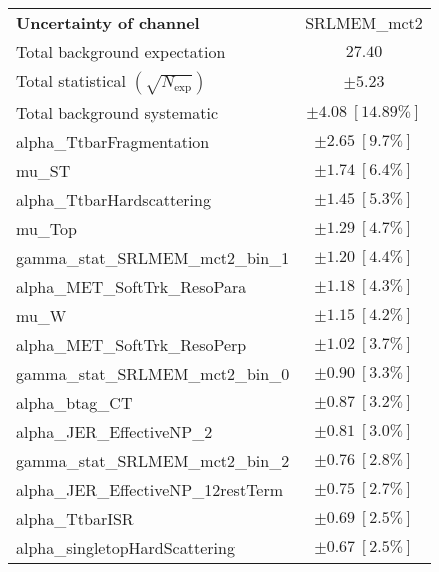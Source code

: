 
\begin{table}
\begin{center}
\setlength{\tabcolsep}{0.0pc}
\begin{tabular*}{\textwidth}{@{\extracolsep{\fill}}lc}
\noalign{\smallskip}\hline\noalign{\smallskip}
{\textbf{Uncertainty of channel}}                                    & SRLMEM\_mct2            \\
\noalign{\smallskip}\hline\noalign{\smallskip}
Total background expectation             &  $27.40$       \\
\noalign{\smallskip}\hline\noalign{\smallskip}
Total statistical $(\sqrt{N_{\mathrm{exp}}})$              & $\pm 5.23$       \\
Total background systematic               & $\pm 4.08\ [14.89\%] $             \\
\noalign{\smallskip}\hline\noalign{\smallskip}
\noalign{\smallskip}\hline\noalign{\smallskip}
alpha\_TtbarFragmentation         & $\pm 2.65\ [9.7\%] $       \\
mu\_ST         & $\pm 1.74\ [6.4\%] $       \\
alpha\_TtbarHardscattering         & $\pm 1.45\ [5.3\%] $       \\
mu\_Top         & $\pm 1.29\ [4.7\%] $       \\
gamma\_stat\_SRLMEM\_mct2\_bin\_1         & $\pm 1.20\ [4.4\%] $       \\
alpha\_MET\_SoftTrk\_ResoPara         & $\pm 1.18\ [4.3\%] $       \\
mu\_W         & $\pm 1.15\ [4.2\%] $       \\
alpha\_MET\_SoftTrk\_ResoPerp         & $\pm 1.02\ [3.7\%] $       \\
gamma\_stat\_SRLMEM\_mct2\_bin\_0         & $\pm 0.90\ [3.3\%] $       \\
alpha\_btag\_CT         & $\pm 0.87\ [3.2\%] $       \\
alpha\_JER\_EffectiveNP\_2         & $\pm 0.81\ [3.0\%] $       \\
gamma\_stat\_SRLMEM\_mct2\_bin\_2         & $\pm 0.76\ [2.8\%] $       \\
alpha\_JER\_EffectiveNP\_12restTerm         & $\pm 0.75\ [2.7\%] $       \\
alpha\_TtbarISR         & $\pm 0.69\ [2.5\%] $       \\
alpha\_singletopHardScattering         & $\pm 0.67\ [2.5\%] $       \\

\end{tabular*}
\end{center}
\end{table}
